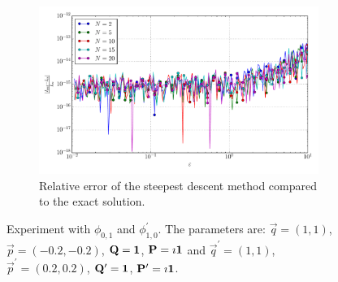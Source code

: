 \documentclass[a4paper,10pt]{article}
\begin{document}
\begin{figure}[ht!]
\begin{subfigure}[t]{0.5\linewidth}
    \includegraphics[width=\linewidth]{./plots/tp_2d_conv_eps_(0,1)_(1,0)_err_rel_nsd.pdf}
    \caption{Relative error of the steepest descent method compared to the exact solution.}
    \label{fig:tp_2d_conv_eps_01_10_err_rel_nsd}
  \end{subfigure}
  \label{fig:tp_2d_conv_eps_01_10}
  \caption{Experiment with $\phi_{0,1}$ and $\phi_{1,0}^{\prime}$.
  The parameters are:
  $\vec{q} = (1, 1)$,
  $\vec{p} = (-0.2, -0.2)$,
  $\mathbf{Q} = \mathbf{1}$,
  $\mathbf{P} = \imath \mathbf{1}$
  and
  $\vec{q}^\prime = (1, 1)$,
  $\vec{p}^\prime = (0.2, 0.2)$,
  $\mathbf{Q}^\prime = \mathbf{1}$,
  $\mathbf{P}^\prime = \imath \mathbf{1}$.}
\end{figure}
\end{document}
